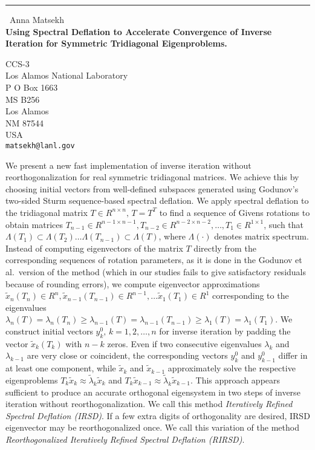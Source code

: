 \documentclass{report}
\begin{document}
\begin{center}
\rule{6in}{1pt} \
{\large Anna Matsekh \\
{\bf Using Spectral Deflation to Accelerate Convergence of Inverse Iteration for Symmetric Tridiagonal Eigenproblems.}}

CCS-3 \\ Los Alamos National Laboratory \\ P O Box 1663 \\ MS B256 \\ Los Alamos \\ NM 87544 \\ USA
\\
{\tt matsekh@lanl.gov}\end{center}

We present a new fast implementation of inverse iteration without
reorthogonalization for real symmetric tridiagonal matrices.
We achieve this by choosing initial vectors from well-defined
subspaces generated using Godunov's two-sided Sturm sequence-based spectral
deflation. We apply spectral deflation to the
tridiagonal matrix $T \in R^{n\times n},\, T = T^T$ to find a
sequence of Givens rotations to obtain matrices $T_{n-1} \in R^{n-1 \times
n-1}, T_{n-2} \in R^{n-2 \times n-2},\ldots, T_{1} \in R^{1\times
1}$, such that $\Lambda(T_{1}) \subset \Lambda(T_{2})\ldots
\Lambda(T_{n-1}) \subset \Lambda(T)$, where $\Lambda(\cdot)$
denotes matrix spectrum. Instead of computing eigenvectors
of the matrix $T$ directly from the corresponding sequences of
rotation parameters, as it is done in the Godunov et al.\
version of the method (which in our studies fails to give
satisfactory residuals because of rounding errors), we compute
eigenvector approximations $\tilde{x}_n(T_n) \in R^{n},
\tilde{x}_{n-1}(T_{n-1}) \in R^{n-1}, \ldots \tilde{x}_1(T_1) \in
R^{1}$ corresponding to the eigenvalues
$\lambda_n(T)=\lambda_n(T_n) \geq
\lambda_{n-1}(T)=\lambda_{n-1}(T_{n-1}) \geq
\lambda_1(T)=\lambda_1(T_1)$. We construct initial vectors
${y^0_k},\, k = 1, 2, \ldots, n$ for inverse iteration by padding
the vector $\tilde{x}_k(T_{k})$ with $n-k$ zeros. Even if two
consecutive eigenvalues $\lambda_k$ and $\lambda_{k-1}$ are very
close or coincident, the corresponding vectors ${y^0_k}$ and
${y^0_{k-1}}$ differ in at least one component, while
$\tilde{x}_k$ and $\tilde{x}_{k-1}$ approximately solve the
respective eigenproblems $T_{k} \tilde{x}_{k} \approx
\tilde{\lambda}_{k} \tilde{x}_k$ and $T_{k} \tilde{x}_{k-1}
\approx \tilde{\lambda}_{k} \tilde{x}_{k-1}$. This approach appears
sufficient to produce an accurate orthogonal eigensystem
in two steps of inverse iteration without reorthogonalization. We
call this method \emph{Iteratively Refined Spectral Deflation (IRSD)}.
If a few extra digits of orthogonality are desired, IRSD eigenvector
may be reorthogonalized once. We call this variation of the method
\emph{Reorthogonalized Iteratively Refined Spectral Deflation (RIRSD)}.
\end{document}
